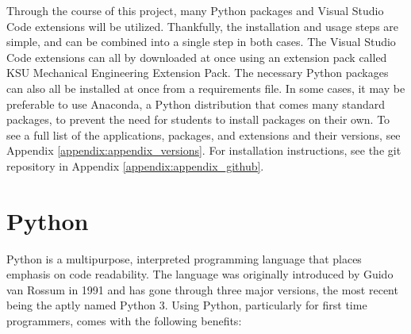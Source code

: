 Through the course of this project, many Python packages and Visual Studio Code extensions will
be utilized. Thankfully, the installation and usage steps are simple, and can be combined into a single 
step in both cases. The Visual Studio Code extensions can all by downloaded at once using an
extension pack called KSU Mechanical Engineering Extension Pack. The necessary Python packages can also
all be installed at once from a requirements file. In some cases, it may be preferable to use Anaconda,
a Python distribution that comes many standard packages, to prevent the need for students to install
packages on their own. To see a full list of the applications, packages, and extensions and their versions, 
see Appendix \ref{appendix:appendix_versions}. For installation instructions, see the git repository in 
Appendix \ref{appendix:appendix_github}. 

\section{Python}

Python is a multipurpose, interpreted programming language that places emphasis on code readability. The language
was originally introduced by Guido van Rossum in 1991 and has gone through three major versions,
the most recent being the aptly named Python 3. Using Python, particularly for first time programmers,
comes with the following benefits:

